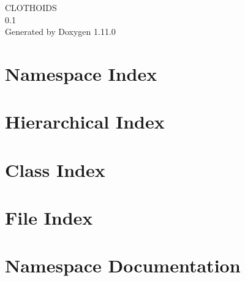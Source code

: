 \documentclass[twoside]{book}
\newcommand{\+}{\discretionary{\mbox{\scriptsize$\hookleftarrow$}}{}{}}
\newcommand{\clearemptydoublepage}{%
    \newpage{\pagestyle{empty}\cleardoublepage}%
  }
\begin{document}
  \raggedbottom
    \hypersetup{pageanchor=false,
                bookmarksnumbered=true,
                pdfencoding=unicode
               }
  \begin{titlepage}
  \vspace*{7cm}
  \begin{center}%
  {\Large CLOTHOIDS}\\
  [1ex]\large 0.\+1 \\
  \vspace*{1cm}
  {\large Generated by Doxygen 1.11.0}\\
  \end{center}
  \end{titlepage}
  \clearemptydoublepage
  \tableofcontents
  \clearemptydoublepage
  \hypersetup{pageanchor=true}
\chapter{Namespace Index}

\chapter{Hierarchical Index}

\chapter{Class Index}

\chapter{File Index}

\chapter{Namespace Documentation}


\end{document}
